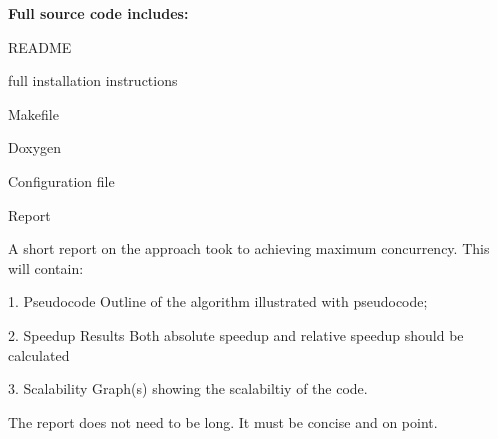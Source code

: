 {\bfseries Full source code includes\+: }
\begin{DoxyItemize}
\item R\+E\+A\+D\+ME
\item full installation instructions
\item Makefile
\item Doxygen
\item Configuration file
\item Report

A short report on the approach took to achieving maximum concurrency. This will contain\+: \begin{DoxyVerb}1. Pseudocode Outline of the algorithm illustrated with pseudocode;

2. Speedup Results Both absolute speedup and relative speedup should be calculated

3. Scalability Graph(s) showing the scalabiltiy of the code.
\end{DoxyVerb}


The report does not need to be long. It must be concise and on point. 
\end{DoxyItemize}